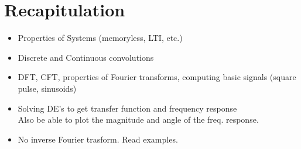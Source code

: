\documentclass{article}
\begin{document}
\section{Recapitulation}
\begin{itemize}
    \item Properties of Systems (memoryless, LTI, etc.)
    \item Discrete and Continuous convolutions
    \item DFT, CFT, properties of Fourier transforms,
        computing basic signals (square pulse, sinusoids)
    \item Solving DE's to get transfer function and frequency response
        \\Also be able to plot the magnitude and angle of the freq. response.
    \item No inverse Fourier trasform. Read examples.
\end{itemize}
\end{document}
